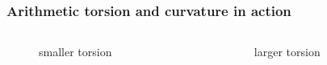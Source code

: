\documentclass[aspectratio=169]{beamer}
\begin{document}
\begin{frame}
    \frametitle{Arithmetic torsion and curvature in action}
    \begin{columns}
        \begin{column}{0.4\textwidth}
            \begin{figure}[ht]\centering
                \caption{smaller torsion}
            \end{figure}
        \end{column}
        \begin{column}{0.4\textwidth}
            \begin{figure}[ht]\centering
                \caption{larger torsion}
            \end{figure}
        \end{column}
    \end{columns}
\end{frame}
\end{document}
